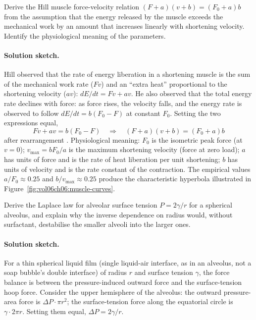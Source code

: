 \begin{exercise}
Derive the Hill muscle force-velocity relation
$(F + a)(v + b) = (F_0 + a) b$ from the assumption that the
energy released by the muscle exceeds the mechanical work by an
amount that increases linearly with shortening velocity. Identify
the physiological meaning of the parameters.
\end{exercise}

\paragraph{Solution sketch.}
Hill observed that the rate of energy liberation in a shortening
muscle is the sum of the mechanical work rate ($Fv$) and an
``extra heat'' proportional to the shortening velocity ($av$):
$dE/dt = Fv + av$. He also observed that the total energy rate
declines with force: as force rises, the velocity falls, and the
energy rate is observed to follow $dE/dt = b(F_0 - F)$ at constant
$F_0$. Setting the two expressions equal,
\[
Fv + av = b(F_0 - F) \quad\Longrightarrow\quad
(F + a)(v + b) = (F_0 + a) b
\]
after rearrangement \cite[p.~151]{paper:v6c06-hill-1938}.
Physiological meaning: $F_0$ is the isometric peak force (at $v = 0$);
$v_{\max} = b F_0/a$ is the maximum shortening velocity (force at
zero load); $a$ has units of force and is the rate of heat
liberation per unit shortening; $b$ has units of velocity and is
the rate constant of the contraction. The empirical values
$a/F_0 \approx 0.25$ and $b/v_{\max} \approx 0.25$ produce the
characteristic hyperbola illustrated in
Figure~\ref{fig:vol06ch06:muscle-curves}.

\begin{exercise}
Derive the Laplace law for alveolar surface tension
$P = 2\gamma/r$ for a spherical alveolus, and explain why the
inverse dependence on radius would, without surfactant, destabilise
the smaller alveoli into the larger ones.
\end{exercise}

\paragraph{Solution sketch.}
For a thin spherical liquid film (single liquid-air interface, as in
an alveolus, not a soap bubble's double interface) of radius $r$ and
surface tension $\gamma$, the force balance is between the
pressure-induced outward force and the surface-tension hoop force.
Consider the upper hemisphere of the alveolus: the outward
pressure-area force is $\Delta P \cdot \pi r^2$; the surface-tension
force along the equatorial circle is $\gamma \cdot 2\pi r$. Setting
them equal,
$\Delta P = 2\gamma/r$.


